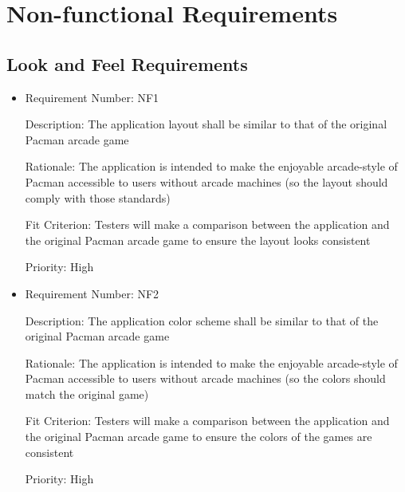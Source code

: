 \documentclass[12pt, titlepage]{article}
\begin{document}
\section{Non-functional Requirements}

\subsection{Look and Feel Requirements}
\begin{itemize}
	\item
	Requirement Number: NF1

	Description: The application layout shall be similar to that of the original Pacman arcade game

	Rationale: The application is intended to make the enjoyable arcade-style of Pacman accessible to users without arcade machines (so the layout should comply with those standards)

	Fit Criterion: Testers will make a comparison between the application and the original Pacman arcade game to ensure the layout looks consistent

	Priority: High

	\item
	Requirement Number: NF2

	Description: The application color scheme shall be similar to that of the original Pacman arcade game

	Rationale: The application is intended to make the enjoyable arcade-style of Pacman accessible to users without arcade machines (so the colors should match the original game)

	Fit Criterion: Testers will make a comparison between the application and the original Pacman arcade game to ensure the colors of the games are consistent

	Priority: High
\end{itemize}
\end{document}
